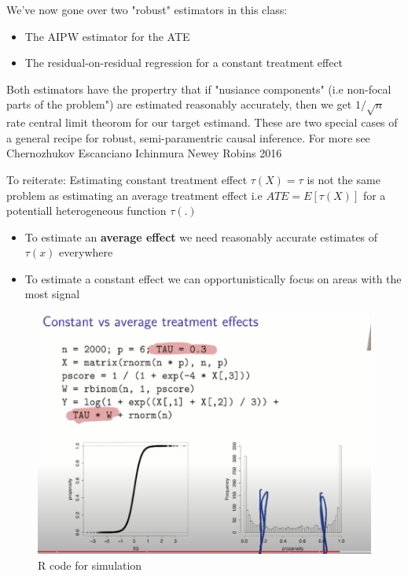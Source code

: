 \documentclass{article}
\begin{document}
We've now gone over two "robust" estimators in this class:

\begin{itemize}
    \item The AIPW estimator for the ATE
    \item The residual-on-residual regression for a constant treatment effect
\end{itemize}

Both estimators have the propertry that if "nusiance components" (i.e non-focal parts of the problem") are estimated reasonably accurately, then we get $1 / \sqrt{n}$ rate central limit theorom for our target estimand. These are two special cases of a general recipe for robust, semi-paramentric causal inference. For more see Chernozhukov Escanciano Ichinmura Newey Robins 2016

To reiterate: Estimating constant treatment effect $\tau (X) = \tau$ is not the same problem as estimating an average treatment effect i.e $ATE = E [ \tau (X)]$ for a potentiall heterogeneous function $\tau(.)$
\begin{itemize}
    \item To estimate an \textbf{average effect} we need reasonably accurate estimates of $\tau (x)$ everywhere
    \item To estimate a constant effect we can opportunistically focus on areas with the most signal
\end{itemize}



\begin{figure}[H]
    \centering
    \includegraphics[scale = 0.3]{r_code.png}
    \caption{R code for simulation}
    \label{fig:reg_partition}
\end{figure}
\end{document}
